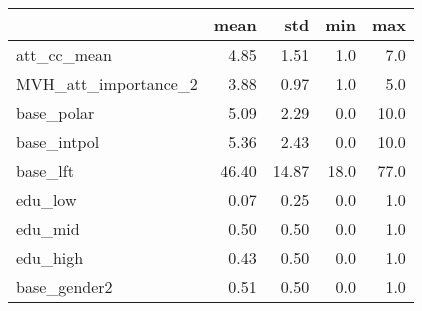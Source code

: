 \begin{tabular}{lrrrr}
\toprule
{} &   mean &    std &   min &   max \\
\midrule
att\_cc\_mean          &   4.85 &   1.51 &   1.0 &   7.0 \\
MVH\_att\_importance\_2 &   3.88 &   0.97 &   1.0 &   5.0 \\
base\_polar           &   5.09 &   2.29 &   0.0 &  10.0 \\
base\_intpol          &   5.36 &   2.43 &   0.0 &  10.0 \\
base\_lft             &  46.40 &  14.87 &  18.0 &  77.0 \\
edu\_low              &   0.07 &   0.25 &   0.0 &   1.0 \\
edu\_mid              &   0.50 &   0.50 &   0.0 &   1.0 \\
edu\_high             &   0.43 &   0.50 &   0.0 &   1.0 \\
base\_gender2         &   0.51 &   0.50 &   0.0 &   1.0 \\
\bottomrule
\end{tabular}
